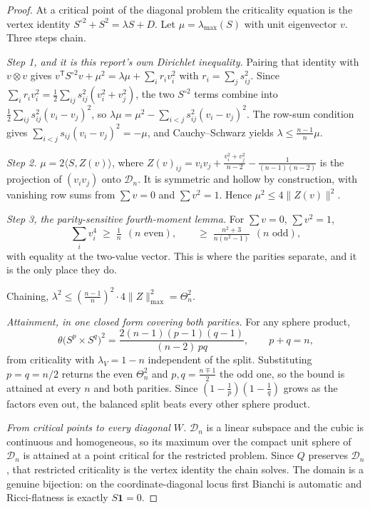 \begin{proof}
At a critical point of the diagonal problem the criticality equation is the vertex identity $S^{\circ2}+S^2=\lambda S+D$. Let $\mu=\lambda_{\max}(S)$ with unit eigenvector $v$. Three steps chain.

\emph{Step 1, and it is this report's own Dirichlet inequality.} Pairing that identity with $v\otimes v$ gives $v^{\mathsf T}S^{\circ2}v+\mu^2=\lambda\mu+\sum_ir_iv_i^2$ with $r_i=\sum_js_{ij}^2$. Since $\sum_ir_iv_i^2=\tfrac12\sum_{ij}s_{ij}^2(v_i^2+v_j^2)$, the two $S^{\circ2}$ terms combine into $\tfrac12\sum_{ij}s_{ij}^2(v_i-v_j)^2$, so $\lambda\mu=\mu^2-\sum_{i<j}s_{ij}^2(v_i-v_j)^2$. The row-sum condition gives $\sum_{i<j}s_{ij}(v_i-v_j)^2=-\mu$, and Cauchy--Schwarz yields $\lambda\le\tfrac{n-1}n\mu$.

\emph{Step 2.} $\mu=2\langle S,Z(v)\rangle$, where $Z(v)_{ij}=v_iv_j+\tfrac{v_i^2+v_j^2}{n-2}-\tfrac1{(n-1)(n-2)}$ is the projection of $(v_iv_j)$ onto $\mathcal D_n$. It is symmetric and hollow by construction, with vanishing row sums from $\sum v=0$ and $\sum v^2=1$. Hence $\mu^2\le4\|Z(v)\|^2$.

\emph{Step 3, the parity-sensitive fourth-moment lemma.} For $\sum v=0$, $\sum v^2=1$,
\[
\textstyle\sum_i v_i^4\;\ge\;\tfrac1n\ \ (n\text{ even}),\qquad \ge\;\tfrac{n^2+3}{n(n^2-1)}\ \ (n\text{ odd}),
\]
with equality at the two-value vector. This is where the parities separate, and it is the only place they do.

Chaining, $\lambda^2\le(\tfrac{n-1}n)^2\cdot4\|Z\|^2_{\max}=\Theta_n^2$.

\emph{Attainment, in one closed form covering both parities.} For any sphere product,
\[
\theta\big(S^p\times S^q\big)^2=\frac{2(n-1)(p-1)(q-1)}{(n-2)\,pq},\qquad p+q=n,
\]
from criticality with $\lambda_V=1-n$ independent of the split. Substituting $p=q=n/2$ returns the even $\Theta_n^2$ and $p,q=\tfrac{n\mp1}2$ the odd one, so the bound is attained at every $n$ and both parities. Since $(1-\tfrac1p)(1-\tfrac1q)$ grows as the factors even out, the balanced split beats every other sphere product.

\emph{From critical points to every diagonal $W$.} $\mathcal D_n$ is a linear subspace and the cubic is continuous and homogeneous, so its maximum over the compact unit sphere of $\mathcal D_n$ is attained at a point critical for the restricted problem. Since $Q$ preserves $\mathcal D_n$, that restricted criticality is the vertex identity the chain solves. The domain is a genuine bijection: on the coordinate-diagonal locus first Bianchi is automatic and Ricci-flatness is exactly $S\mathbf1=0$.
\end{proof}


